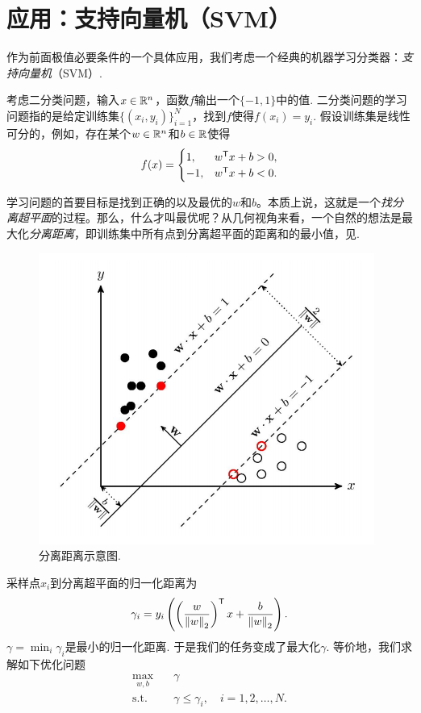 \section{应用：支持向量机（SVM）}

作为前面极值必要条件的一个具体应用，我们考虑一个经典的机器学习分类器：\emph{支持向量机}（SVM）. 

考虑二分类问题，输入$x\in \mathbb{R}^n$，函数$f$输出一个$\{-1,1\}$中的值. 二分类问题的学习问题指的是给定训练集$\{(x_i,y_i)\}_{i=1}^N$，找到$f$使得$f(x_i)=y_i$. 假设训练集是线性可分的，例如，存在某个$w\in \mathbb{R}^n$和$b\in \mathbb{R}$使得
    $$f(x)=\begin{cases}
		1,& w^{\mathsf{T}} x+b>0,\\
		-1, &w^{\mathsf{T}} x+b<0.
	\end{cases}$$

学习问题的首要目标是找到正确的以及最优的$w$和$b$。本质上说，这就是一个\emph{找分离超平面}的过程。那么，什么才叫最优呢？从几何视角来看，一个自然的想法是最大化\emph{分离距离}，即训练集中所有点到分离超平面的距离和的最小值，见.
\begin{figure}
    \centering
    \includegraphics[scale=0.8]{Chapters/duality/figures/svm.png}
    \caption{分离距离示意图.}
    \label{fig:svm}
\end{figure}

采样点$x_i$到分离超平面的归一化距离为
    $$\gamma_i=y_i\left(\left(\frac{w}{\left\|w\right\|_2}\right)^{\mathsf{T}} x+\frac{b}{\left\|w\right\|_2}\right).$$
$\gamma=\min_i\gamma_i$是最小的归一化距离. 于是我们的任务变成了最大化$\gamma$. 等价地，我们求解如下优化问题
\begin{align*}
    \max_{w,b}\quad&\gamma \\
    \text{s.t.}\quad&\gamma\le\gamma_i,\quad i=1,2,\dots,N.
\end{align*}

